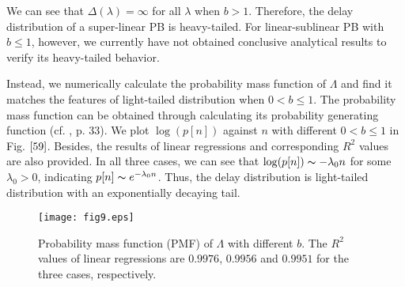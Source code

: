 \documentclass[journal]{IEEEtran}
\begin{document}
We can see that $\Delta(\lambda)=\infty$ for all $\lambda$ when $b>1$. Therefore, the delay distribution of a super-linear PB is heavy-tailed. For linear-sublinear PB with $b\leq 1$, however, we currently have not obtained conclusive analytical results to verify its heavy-tailed behavior.

Instead, we numerically calculate the probability mass function of $\Lambda$ and find it matches the features of light-tailed distribution when $0<b\leq1$. The probability mass function can be obtained through calculating its probability generating function (cf. \cite{2006:Mieghem}, p. $33$). We plot $\log(p[n])$ against $n$ with different $0<b\leq1$ in Fig. $\ref{59}$. Besides, the results of linear regressions and corresponding $R^2$ values are also provided. In all three cases, we can see that $\log(p[n])\thicksim -\lambda_0 n$ for some $\lambda_0>0$, indicating $p[n]\thicksim e^{-\lambda_0 n}$. Thus, the delay distribution is light-tailed distribution with an exponentially decaying tail.


\begin{figure}
\centering
  \begin{center}
    \texttt{[image: fig9.eps]}
  \end{center}
  \caption{Probability mass function (PMF) of $\Lambda$ with different $b$. The $R^2$ values of linear regressions are $0.9976$, $0.9956$ and $0.9951$ for the three cases, respectively.}
  \label{59}
\end{figure}
\end{document}
